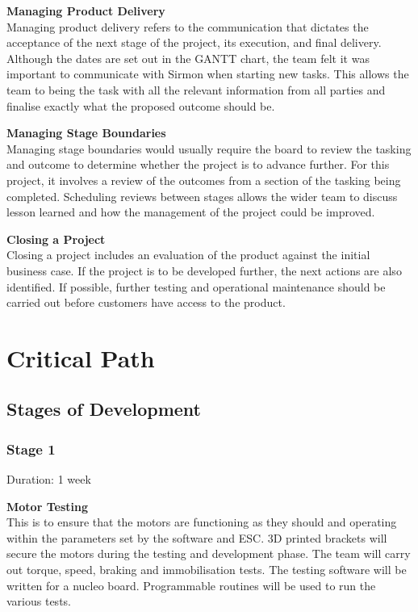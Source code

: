 \documentclass [12pt]{article}
\begin{document}
\textbf{Managing Product Delivery}\\
Managing product delivery refers to the communication that dictates the acceptance of the next stage of the project, its execution, and final delivery. Although the dates are set out in the GANTT chart, the team felt it was important to communicate with Sirmon when starting new tasks. This allows the team to being the task with all the relevant information from all parties and finalise exactly what the proposed outcome should be.

\textbf{Managing Stage Boundaries}\\
Managing stage boundaries would usually require the board to review the tasking and outcome to determine whether the project is to advance further. For this project, it involves a review of the outcomes from a section of the tasking being completed. Scheduling reviews between stages allows the wider team to discuss lesson learned and how the management of the project could be improved.

\textbf{Closing a Project}\\
Closing a project includes an evaluation of the product against the initial business case. If the project is to be developed further, the next actions are also identified. If possible, further testing and operational maintenance should be carried out before customers have access to the product.

\section{Critical Path}\label{sec:critical_path}

\subsection{Stages of Development}\label{sec:stages_of_development}

\subsubsection{Stage 1}

Duration: 1 week

\textbf{Motor Testing}\\
This is to ensure that the motors are functioning as they should and operating within the parameters set by the software and ESC. 3D printed brackets will secure the motors during the testing and development phase. The team will carry out torque, speed, braking and immobilisation tests. The testing software will be written for a nucleo board. Programmable routines will be used to run the various tests.
\end{document}
